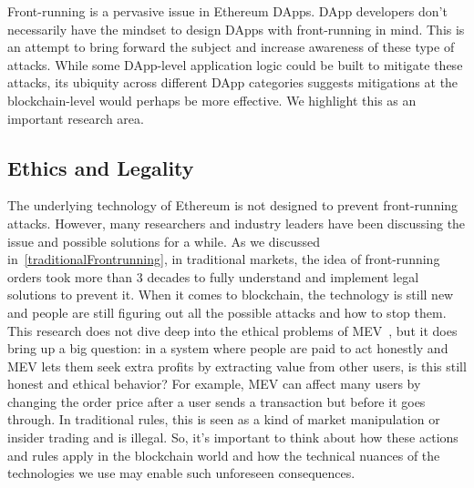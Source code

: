 Front-running is a pervasive issue in Ethereum DApps. DApp developers don't necessarily have the mindset to design DApps with front-running in mind. This is an attempt to bring forward the subject and increase awareness of these type of attacks. While some DApp-level application logic could be built to mitigate these attacks, its ubiquity across different DApp categories suggests mitigations at the blockchain-level would perhaps be more effective. We highlight this as an important research area.


\subsection{Ethics and Legality}
The underlying technology of Ethereum is not designed to prevent front-running attacks. However, many researchers and industry leaders have been discussing the issue and possible solutions for a while. As we discussed in~\ref{traditionalFrontrunning}, in traditional markets, the idea of front-running orders took more than 3 decades to fully understand and implement legal solutions to prevent it. When it comes to blockchain, the technology is still new and people are still figuring out all the possible attacks and how to stop them. This research does not dive deep into the ethical problems of MEV~\cite{cryptofrens2023}, but it does bring up a big question: in a system where people are paid to act honestly and MEV lets them seek extra profits by extracting value from other users, is this still honest and ethical behavior? For example, MEV can affect many users by changing the order price after a user sends a transaction but before it goes through. In traditional rules, this is seen as a kind of market manipulation or insider trading and is illegal. So, it's important to think about how these actions and rules apply in the blockchain world and how the technical nuances of the technologies we use may enable such unforeseen consequences.